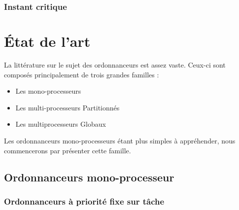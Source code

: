 \documentclass[11pt,a4paper,oneside]{report}
\begin{document}
\subsection{Instant critique}



\chapter{État de l'art}

La littérature sur le sujet des ordonnanceurs est assez vaste. 
Ceux-ci sont composés principalement de trois grandes familles :\\
\begin{itemize}
	\item Les mono-processeurs
	\item Les multi-processeurs Partitionnés
	\item Les multiprocesseurs Globaux
\end{itemize}
Les ordonnanceurs mono-processeurs étant plus simples à appréhender, nous commencerons 
par présenter cette famille.

\section{Ordonnanceurs mono-processeur}
\subsection{Ordonnanceurs à priorité fixe sur tâche}
\end{document}
